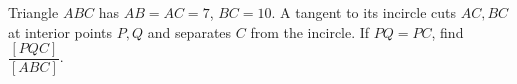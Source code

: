 Triangle $ABC$ has $AB=AC=7$, $BC=10$. A tangent to its incircle cuts $AC,BC$ at interior points $P,Q$ and separates $C$ from the incircle. If $PQ=PC$, find $\dfrac{[PQC]}{[ABC]}$.

